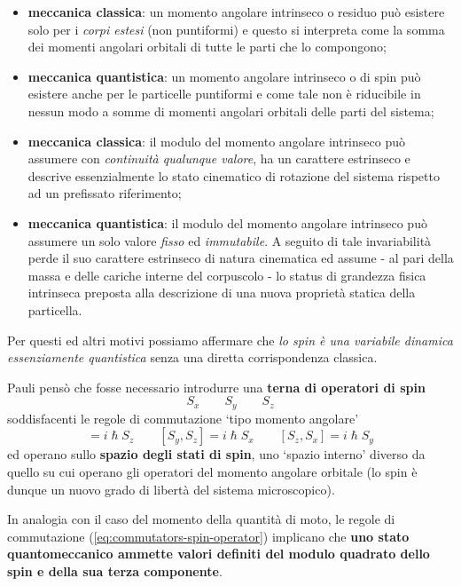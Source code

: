 \begin{itemize}
	\tightlist
	\item
	      \textbf{meccanica classica}: un momento angolare intrinseco o residuo
	      può esistere solo per i \emph{corpi estesi} (non puntiformi) e questo
	      si interpreta come la somma dei momenti angolari orbitali di tutte le
	      parti che lo compongono;
	\item
	      \textbf{meccanica quantistica}: un momento angolare intrinseco o di
	      spin può esistere anche per le particelle puntiformi e come tale non è
	      riducibile in nessun modo a somme di momenti angolari orbitali delle
	      parti del sistema;
	\item
	      \textbf{meccanica classica}: il modulo del momento angolare intrinseco
	      può assumere con \emph{continuità qualunque valore}, ha un carattere
	      estrinseco e descrive essenzialmente lo stato cinematico di rotazione
	      del sistema rispetto ad un prefissato riferimento;
	\item
	      \textbf{meccanica quantistica}: il modulo del momento angolare
	      intrinseco può assumere un solo valore \emph{fisso} ed
	      \emph{immutabile}.
	      A seguito di tale invariabilità perde il suo
	      carattere estrinseco di natura cinematica ed assume - al pari della
	      massa e delle cariche interne del corpuscolo - lo status di grandezza
	      fisica intrinseca preposta alla descrizione di una nuova proprietà
	      statica della particella.
\end{itemize}

Per questi ed altri motivi possiamo affermare che \emph{lo spin è una
	variabile dinamica essenziamente quantistica} senza una diretta
corrispondenza classica.

Pauli pensò che fosse necessario introdurre una \textbf{terna di
	operatori di spin} \[
	S_{x} \qquad S_{y} \qquad S_{z}
\] soddisfacenti le regole di commutazione `tipo momento angolare'
\begin{equation}
[ S_{x},S_{y}] = i \hslash S_{z} \qquad  [ S_{y},S_{z}] = i \hslash S_{x} \qquad   [ S_{z},S_{x}] = i \hslash S_{y}
     \label{eq:commutators-spin-operator}
\end{equation}
ed operano sullo \textbf{spazio degli stati di spin}, uno `spazio
interno' diverso da quello su cui operano gli operatori del momento
angolare orbitale (lo spin è dunque un nuovo grado di libertà del
sistema microscopico).

In analogia con il caso del momento della quantità di moto, le regole di
commutazione (\ref{eq:commutators-spin-operator}) implicano che \textbf{uno stato
	quantomeccanico ammette valori definiti del modulo quadrato dello spin e
	 della sua terza componente}.

